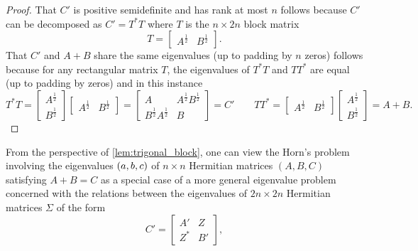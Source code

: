 \documentclass[notitlepage, 10pt]{article}
\begin{document}
\begin{proof}
    That $C'$ is positive semidefinite and has rank at most $n$ follows because $C'$ can be decomposed as $C' = T^{*} T$ where $T$ is the $n \times 2n$ block matrix
    \begin{equation}
        T = \begin{bmatrix} A^{\frac{1}{2}} & B^{\frac{1}{2}} \end{bmatrix}.
    \end{equation}
    That $C'$ and $A+B$ share the same eigenvalues (up to padding by $n$ zeros) follows because for any rectangular matrix $T$, the eigenvalues of $T^{*}T$ and $TT^{*}$ are equal (up to padding by zeros) and in this instance
    \begin{equation}
        T^{*}T = 
        \begin{bmatrix} A^{\frac{1}{2}} \\ B^{\frac{1}{2}} \end{bmatrix}
        \begin{bmatrix} A^{\frac{1}{2}} & B^{\frac{1}{2}} \end{bmatrix}
        =
        \begin{bmatrix}
            A & A^{\frac{1}{2}}B^{\frac{1}{2}} \\
            B^{\frac{1}{2}}A^{\frac{1}{2}} & B
        \end{bmatrix}
        = C'
        \qquad
        TT^{*} = 
        \begin{bmatrix} A^{\frac{1}{2}} & B^{\frac{1}{2}} \end{bmatrix}
        \begin{bmatrix} A^{\frac{1}{2}} \\ B^{\frac{1}{2}} \end{bmatrix}
        = A + B.
    \end{equation}
\end{proof}
From the perspective of \cref{lem:trigonal_block}, one can view the Horn's problem involving the eigenvalues $(a,b,c)$ of $n\times n$ Hermitian matrices $(A,B,C)$ satisfying $A+B=C$ as a special case of a more general eigenvalue problem concerned with the relations between the eigenvalues of $2n \times 2n$ Hermitian matrices $\Sigma$ of the form
\begin{equation}
    \label{eq:block_ABX}
    C' = \begin{bmatrix}
        A' & Z \\
        Z^{*} & B'
    \end{bmatrix},
\end{equation}
\end{document}
